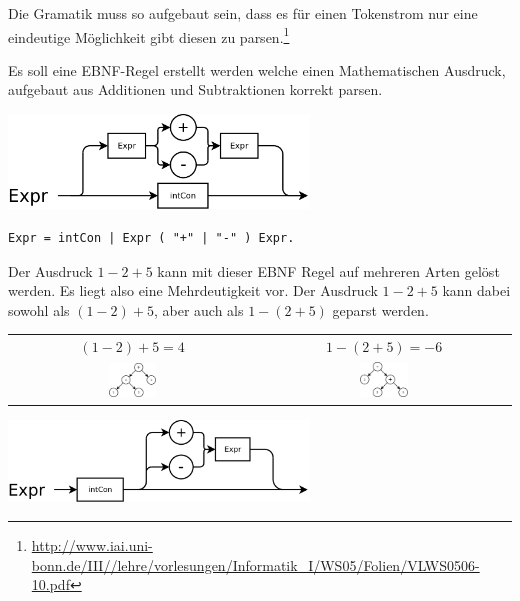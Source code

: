 Die Gramatik muss so aufgebaut sein, dass es für einen Tokenstrom nur eine eindeutige Möglichkeit gibt diesen zu parsen.\footnote{\url{http://www.iai.uni-bonn.de/III//lehre/vorlesungen/Informatik_I/WS05/Folien/VLWS0506-10.pdf}}


Es soll eine EBNF-Regel erstellt werden welche einen Mathematischen Ausdruck, aufgebaut aus Additionen und Subtraktionen korrekt parsen.

\includegraphics[width=0.6\textwidth]{./media/images/compiler/ambiguity_wrong.png}

\begin{lstlisting}[language=EBNF]
Expr = intCon | Expr ( "+" | "-" ) Expr.
\end{lstlisting}

Der Ausdruck $1-2+5$ kann mit dieser EBNF Regel auf mehreren Arten gelöst werden. Es liegt also eine Mehrdeutigkeit vor. Der Ausdruck $1-2+5$ kann dabei sowohl als $(1-2)+5$, aber auch als $1-(2+5)$ geparst werden.

\begin{tabular}{ c | c }
  $(1-2)+5=4$ & 
  $1-(2+5)=-6$ \\
  \includegraphics[width=0.2\textwidth]{./media/images/compiler/ambiguity_tree_correct.png} & 
  \includegraphics[width=0.2\textwidth]{./media/images/compiler/ambiguity_tree_wrong.png} \\
\end{tabular}

\includegraphics[width=0.6\textwidth]{./media/images/compiler/ambiguity_correct.png}

